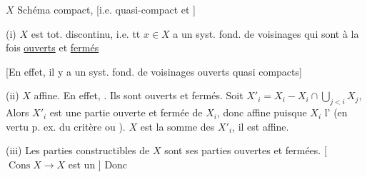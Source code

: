 $X$ Schéma compact, [i.e. quasi-compact et  ]

(i) $X$ est tot. discontinu,  i.e. tt $x\in X$ a un syst. fond. de voisinages qui sont à la fois \uline{ouverts} et \uline{fermés}

[En effet, il y a un syst. fond. de voisinages ouverts quasi compacts]

(ii) $X$  affine. En effet, . Ils sont ouverts et fermés. Soit
$X'_i=X_i-X_i\cap\bigcup_{j<i}X_j$, Alors $X'_i$ est une partie ouverte et fermée de $X_i$, donc affine puisque $X_i$ l' (en vertu p. ex. du critère  \deleted{\unsure{,}} ou ).  $X$ est  la somme des $X'_i$, il est affine.

(iii) Les parties constructibles de $X$ sont ses parties ouvertes et fermées. [ $\operatorname{Cons} X\to X$ est un \deleted{\unsure{homéom.}]} ] Donc
